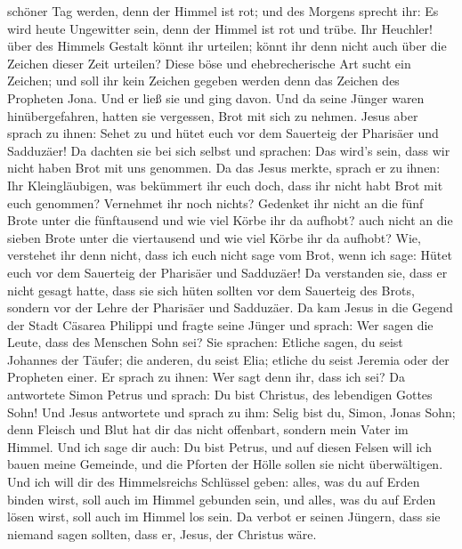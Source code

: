 schöner Tag werden, denn der Himmel ist rot;  und des
Morgens sprecht ihr: Es wird heute Ungewitter sein, denn der Himmel ist
rot und trübe. Ihr Heuchler! über des Himmels Gestalt könnt ihr
urteilen; könnt ihr denn nicht auch über die Zeichen dieser Zeit
urteilen?  Diese böse und ehebrecherische Art sucht ein
Zeichen; und soll ihr kein Zeichen gegeben werden denn das Zeichen des
Propheten Jona. Und er ließ sie und ging davon.  Und da
seine Jünger waren hinübergefahren, hatten sie vergessen, Brot mit sich
zu nehmen.  Jesus aber sprach zu ihnen: Sehet zu und hütet
euch vor dem Sauerteig der Pharisäer und Sadduzäer!  Da
dachten sie bei sich selbst und sprachen: Das wird's sein, dass wir
nicht haben Brot mit uns genommen.  Da das Jesus merkte,
sprach er zu ihnen: Ihr Kleingläubigen, was bekümmert ihr euch doch,
dass ihr nicht habt Brot mit euch genommen?  Vernehmet ihr
noch nichts? Gedenket ihr nicht an die fünf Brote unter die fünftausend
und wie viel Körbe ihr da aufhobt?  auch nicht an die
sieben Brote unter die viertausend und wie viel Körbe ihr da aufhobt?
 Wie, verstehet ihr denn nicht, dass ich euch nicht sage
vom Brot, wenn ich sage: Hütet euch vor dem Sauerteig der Pharisäer und
Sadduzäer!  Da verstanden sie, dass er nicht gesagt hatte,
dass sie sich hüten sollten vor dem Sauerteig des Brots, sondern vor der
Lehre der Pharisäer und Sadduzäer.  Da kam Jesus in die
Gegend der Stadt Cäsarea Philippi und fragte seine Jünger und sprach:
Wer sagen die Leute, dass des Menschen Sohn sei?  Sie
sprachen: Etliche sagen, du seist Johannes der Täufer; die anderen, du
seist Elia; etliche du seist Jeremia oder der Propheten einer.
 Er sprach zu ihnen: Wer sagt denn ihr, dass ich sei?
 Da antwortete Simon Petrus und sprach: Du bist Christus,
des lebendigen Gottes Sohn!  Und Jesus antwortete und
sprach zu ihm: Selig bist du, Simon, Jonas Sohn; denn Fleisch und Blut
hat dir das nicht offenbart, sondern mein Vater im Himmel. 
Und ich sage dir auch: Du bist Petrus, und auf diesen Felsen will ich
bauen meine Gemeinde, und die Pforten der Hölle sollen sie nicht
überwältigen.  Und ich will dir des Himmelsreichs Schlüssel
geben: alles, was du auf Erden binden wirst, soll auch im Himmel
gebunden sein, und alles, was du auf Erden lösen wirst, soll auch im
Himmel los sein.  Da verbot er seinen Jüngern, dass sie
niemand sagen sollten, dass er, Jesus, der Christus wäre. 
